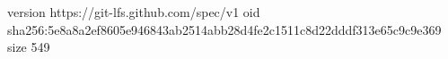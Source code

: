 version https://git-lfs.github.com/spec/v1
oid sha256:5e8a8a2ef8605e946843ab2514abb28d4fe2c1511c8d22dddf313e65c9c9e369
size 549
